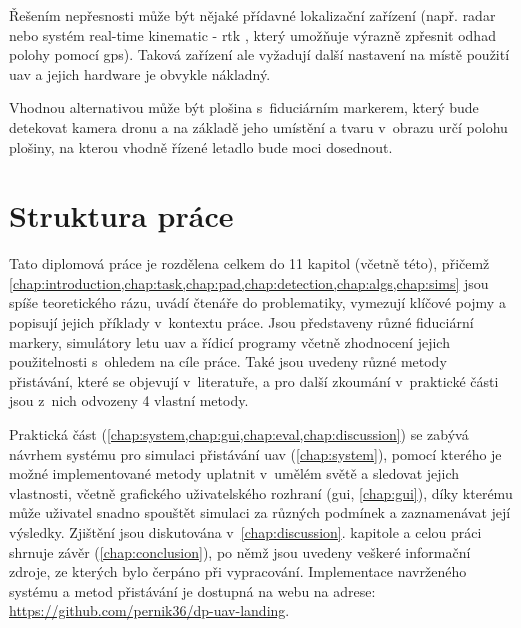 Řešením nepřesnosti může být nějaké přídavné lokalizační zařízení (např. radar nebo systém real-time kinematic - \acrshort{rtk} \cite{rtk}, který umožňuje výrazně zpřesnit odhad polohy pomocí \acrshort{gps}). Taková zařízení ale vyžadují další nastavení na místě použití \acrshort{uav} a jejich hardware je obvykle nákladný.

Vhodnou alternativou může být plošina s~fiduciárním markerem, který bude detekovat kamera dronu a na základě jeho umístění a tvaru v~obrazu určí polohu plošiny, na kterou vhodně řízené letadlo bude moci dosednout.

\section{Struktura práce}
Tato diplomová práce je rozdělena celkem do 11 kapitol (včetně této), přičemž \cref{chap:introduction,chap:task,chap:pad,chap:detection,chap:algs,chap:sims} jsou spíše teoretického rázu, uvádí čtenáře do problematiky, vymezují klíčové pojmy a popisují jejich příklady v~kontextu práce. Jsou představeny různé fiduciární markery, simulátory letu \acrshort{uav} a řídicí programy včetně zhodnocení jejich použitelnosti s~ohledem na cíle práce. Také jsou uvedeny různé metody přistávání, které se objevují v~literatuře, a pro další zkoumání v~praktické části jsou z~nich odvozeny 4 vlastní metody.

Praktická část (\cref{chap:system,chap:gui,chap:eval,chap:discussion}) se zabývá návrhem systému pro simulaci přistávání \acrshort{uav} (\cref{chap:system}), pomocí kterého je možné implementované metody uplatnit v~umělém světě a sledovat jejich vlastnosti, včetně grafického uživatelského rozhraní (\acrshort{gui}, \cref{chap:gui}), díky kterému může uživatel snadno spouštět simulaci za různých podmínek a zaznamenávat její výsledky. Zjištění jsou diskutována v~\ref{chap:discussion}. kapitole a celou práci shrnuje závěr (\cref{chap:conclusion}), po němž jsou uvedeny veškeré informační zdroje, ze kterých bylo čerpáno při vypracování. Implementace navrženého systému a metod přistávání je dostupná na webu na adrese: \url{https://github.com/pernik36/dp-uav-landing}.
